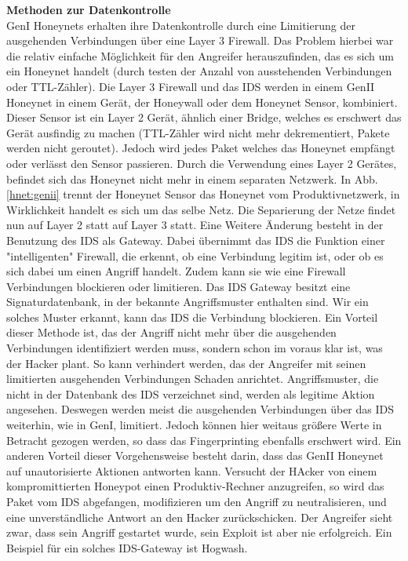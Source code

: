 \newpage
\noindent\textbf{Methoden zur Datenkontrolle}\\
\noindent GenI Honeynets erhalten ihre Datenkontrolle durch eine Limitierung der ausgehenden Verbindungen über eine Layer 3 Firewall. Das Problem hierbei war die relativ einfache Möglichkeit für den Angreifer herauszufinden, das es sich um ein Honeynet handelt (durch testen der Anzahl von ausstehenden Verbindungen oder TTL-Zähler). Die Layer 3 Firewall und das IDS werden in einem GenII Honeynet in einem Gerät, der Honeywall oder dem Honeynet Sensor, kombiniert\cite{WebGenII.2006b}. Dieser Sensor ist ein Layer 2 Gerät, ähnlich einer Bridge, welches es erschwert das Gerät ausfindig zu machen (TTL-Zähler wird nicht mehr dekrementiert, Pakete werden nicht geroutet). Jedoch wird jedes Paket welches das Honeynet empfängt oder verlässt den Sensor passieren\cite{spitzner.2002a}.
Durch die Verwendung eines Layer 2 Gerätes, befindet sich das Honeynet nicht mehr in einem separaten Netzwerk. In Abb. \ref{hnet:genii} trennt der Honeynet Sensor das Honeynet vom Produktivnetzwerk, in Wirklichkeit handelt es sich um das selbe Netz. Die Separierung der Netze findet nun auf Layer 2 statt auf Layer 3 statt.
Eine Weitere Änderung besteht in der Benutzung des IDS als Gateway. Dabei übernimmt das IDS die Funktion einer "intelligenten" Firewall, die erkennt, ob eine Verbindung legitim ist, oder ob es sich dabei um einen Angriff handelt. Zudem kann sie wie eine Firewall Verbindungen blockieren oder limitieren. Das IDS Gateway besitzt eine Signaturdatenbank, in der bekannte Angriffsmuster enthalten sind. Wir ein solches Muster erkannt, kann das IDS die Verbindung blockieren\cite{spitzner.2002a}. 
Ein Vorteil dieser Methode ist, das der Angriff nicht mehr über die ausgehenden Verbindungen identifiziert werden muss, sondern schon im voraus klar ist, was der Hacker plant. So kann verhindert werden, das der Angreifer mit seinen limitierten ausgehenden Verbindungen Schaden anrichtet. Angriffsmuster, die nicht in der Datenbank des IDS verzeichnet sind, werden als legitime Aktion angesehen. Deswegen werden meist die ausgehenden Verbindungen über das IDS weiterhin, wie in GenI, limitiert. Jedoch können hier weitaus größere Werte in Betracht gezogen werden, so dass das Fingerprinting ebenfalls erschwert wird\cite{spitzner.2002a}.
Ein anderen Vorteil dieser Vorgehensweise besteht darin, dass das GenII Honeynet auf unautorisierte Aktionen antworten kann. Versucht der HAcker von einem kompromittierten Honeypot einen Produktiv-Rechner anzugreifen, so wird das Paket vom IDS abgefangen, modifizieren um den Angriff zu neutralisieren, und eine unverständliche Antwort an den Hacker zurückschicken. Der Angreifer sieht zwar, dass sein Angriff gestartet wurde, sein Exploit ist aber nie erfolgreich.
Ein Beispiel für ein solches IDS-Gateway ist Hogwash\cite{spitzner.2002a}.\\

